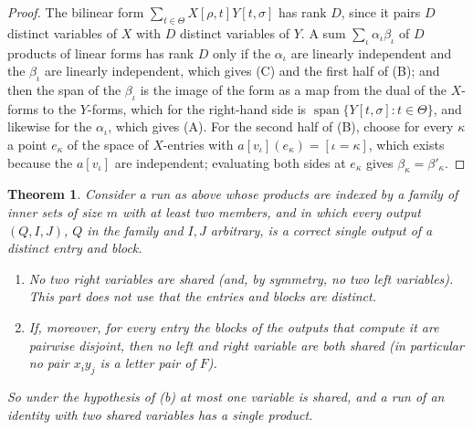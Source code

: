 \documentclass[11pt]{article}
\newtheorem{theorem}{Theorem}[section]
\theoremstyle{definition}
\theoremstyle{remark}
\begin{document}
\begin{proof}
The bilinear form $\sum_{t\in\Theta}X[\rho,t]Y[t,\sigma]$ has rank $D$, since it pairs $D$ distinct variables of $X$ with $D$ distinct variables of $Y$. A sum $\sum_\iota\alpha_\iota\beta_\iota$ of $D$ products of linear forms has rank $D$ only if the $\alpha_\iota$ are linearly independent and the $\beta_\iota$ are linearly independent, which gives (C) and the first half of (B); and then the span of the $\beta_\iota$ is the image of the form as a map from the dual of the $X$-forms to the $Y$-forms, which for the right-hand side is $\operatorname{span}\{Y[t,\sigma]:t\in\Theta\}$, and likewise for the $\alpha_\iota$, which gives (A). For the second half of (B), choose for every $\kappa$ a point $e_\kappa$ of the space of $X$-entries with $a[v_\iota](e_\kappa)=[\iota=\kappa]$, which exists because the $a[v_\iota]$ are independent; evaluating both sides at $e_\kappa$ gives $\beta_\kappa=\beta'_\kappa$.
\end{proof}

\begin{theorem}\label{a:thm:shared}
Consider a run as above whose products are indexed by a family of inner sets of size $m$ with at least two members, and in which every output $(Q,I,J)$, $Q$ in the family and $I,J$ arbitrary, is a correct single output of a distinct entry and block.
\begin{enumerate}[label=(\alph*),nosep]
\item No two right variables are shared (and, by symmetry, no two left variables). This part does not use that the entries and blocks are distinct.
\item If, moreover, for every entry the blocks of the outputs that compute it are pairwise disjoint, then no left and right variable are both shared (in particular no pair $x_iy_j$ is a letter pair of $F$).
\end{enumerate}
So under the hypothesis of (b) at most one variable is shared, and a run of an identity with two shared variables has a single product.
\end{theorem}
\end{document}
